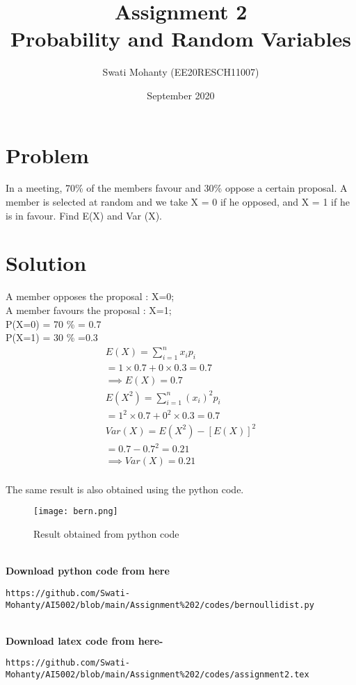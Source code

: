 \documentclass[journal,12pt,twocolumn]{IEEEtran}
\title{Assignment 2
\\Probability and Random Variables }
\author{Swati Mohanty (EE20RESCH11007) }
\date{September 2020}
\begin{document}
\maketitle


\section{Problem}
In a meeting, {70\%} of the members favour and {30\% }oppose a certain proposal. A member is selected at random and we take X = 0 if he opposed, and X = 1 if he is in favour. Find E(X) and Var (X).

\section{Solution}
A member opposes the proposal : X=0;\\
A member favours the proposal : X=1;\\
P(X=0) = 70 {\%} = 0.7\\
P(X=1) = 30 {\%} =0.3
\begin{align}
    E(X) = \sum_{i=1}^{n} x_i p_i 
    \\= 1\times0.7 + 0\times0.3 =0.7
    \\\implies E(X) =0.7
    \\E(X^2) = \sum_{i=1}^{n} (x_i)^2 p_i 
    \\= 1^2\times0.7 + 0^2\times0.3 =0.7
    \\Var(X) = E(X^2) -[E(X)]^2
    \\= 0.7- 0.7^2 = 0.21
    \\\implies Var(X) =0.21
\end{align}
\\The same  result is also obtained using the python code.
\begin{figure}[h]
\renewcommand{\theenumi}{1}
\centering
\texttt{[image: bern.png]}
\caption{Result obtained from python code }
\label{Fig:1}
\end{figure}
\\\textbf{Download python code from here}\\
\begin{lstlisting}
https://github.com/Swati-Mohanty/AI5002/blob/main/Assignment%202/codes/bernoullidist.py
\end{lstlisting}
\\\textbf{Download latex code from here-}\\
\begin{lstlisting}
https://github.com/Swati-Mohanty/AI5002/blob/main/Assignment%202/codes/assignment2.tex
\end{lstlisting}
\end{document}
